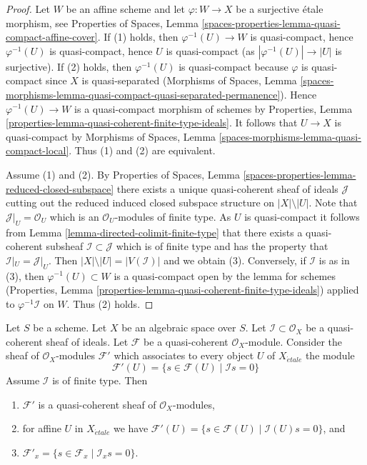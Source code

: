 \begin{proof}
Let $W$ be an affine scheme and let $\varphi : W \to X$ be a surjective
\'etale morphism, see Properties of Spaces, Lemma
\ref{spaces-properties-lemma-quasi-compact-affine-cover}.
If (1) holds, then $\varphi^{-1}(U) \to W$ is quasi-compact, hence
$\varphi^{-1}(U)$ is quasi-compact, hence $U$ is quasi-compact
(as $|\varphi^{-1}(U)| \to |U|$ is surjective). If (2) holds, then
$\varphi^{-1}(U)$ is quasi-compact because $\varphi$ is quasi-compact
since $X$ is quasi-separated (Morphisms of Spaces,
Lemma \ref{spaces-morphisms-lemma-quasi-compact-quasi-separated-permanence}).
Hence $\varphi^{-1}(U) \to W$ is a quasi-compact morphism of schemes by
Properties, Lemma \ref{properties-lemma-quasi-coherent-finite-type-ideals}.
It follows that $U \to X$ is quasi-compact by
Morphisms of Spaces, Lemma \ref{spaces-morphisms-lemma-quasi-compact-local}.
Thus (1) and (2) are equivalent.

\medskip\noindent
Assume (1) and (2). By
Properties of Spaces, Lemma
\ref{spaces-properties-lemma-reduced-closed-subspace} there exists
a unique quasi-coherent sheaf of ideals $\mathcal{J}$ cutting
out the reduced induced closed subspace structure on $|X| \setminus |U|$.
Note that $\mathcal{J}|_U = \mathcal{O}_U$ which is an
$\mathcal{O}_U$-modules of finite type.
As $U$ is quasi-compact it follows from
Lemma \ref{lemma-directed-colimit-finite-type}
that there exists a quasi-coherent subsheaf
$\mathcal{I} \subset \mathcal{J}$ which is of finite type
and has the property that $\mathcal{I}|_U = \mathcal{J}|_U$.
Then $|X| \setminus |U| = |V(\mathcal{I})|$ and we obtain (3). Conversely,
if $\mathcal{I}$ is as in (3), then $\varphi^{-1}(U) \subset W$
is a quasi-compact open by the lemma for schemes
(Properties, Lemma \ref{properties-lemma-quasi-coherent-finite-type-ideals})
applied to $\varphi^{-1}\mathcal{I}$ on $W$.
Thus (2) holds.
\end{proof}

\begin{lemma}
\label{lemma-sections-annihilated-by-ideal}
Let $S$ be a scheme. Let $X$ be an algebraic space over $S$.
Let $\mathcal{I} \subset \mathcal{O}_X$ be a quasi-coherent sheaf of ideals.
Let $\mathcal{F}$ be a quasi-coherent $\mathcal{O}_X$-module.
Consider the sheaf of $\mathcal{O}_X$-modules $\mathcal{F}'$
which associates to every object $U$ of $X_{\acute{e}tale}$ the module
$$
\mathcal{F}'(U)
=
\{s \in \mathcal{F}(U) \mid
\mathcal{I}s = 0\}
$$
Assume $\mathcal{I}$ is of finite type. Then
\begin{enumerate}
\item $\mathcal{F}'$ is a quasi-coherent sheaf of $\mathcal{O}_X$-modules,
\item for affine $U$ in $X_{\acute{e}tale}$ we have
$\mathcal{F}'(U) = \{s \in \mathcal{F}(U) \mid \mathcal{I}(U)s = 0\}$, and
\item $\mathcal{F}'_x = \{s \in \mathcal{F}_x \mid \mathcal{I}_x s = 0\}$.
\end{enumerate}
\end{lemma}

